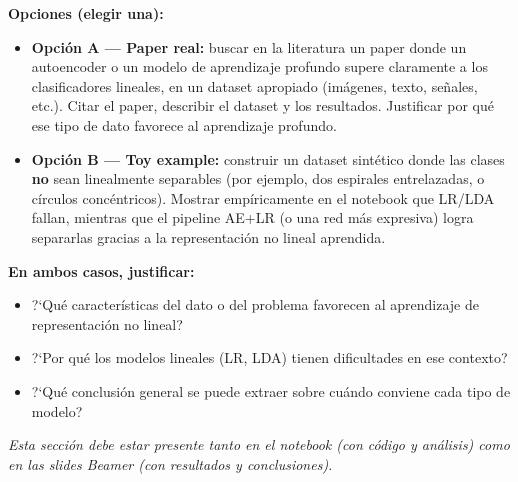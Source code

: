 \documentclass[11pt,a4paper]{article}
\begin{document}
\textbf{Opciones (elegir una):}
\begin{itemize}[leftmargin=2em,itemsep=3pt]
    \item \textbf{Opci\'on A --- Paper real:} buscar en la literatura un paper donde un autoencoder o un modelo de aprendizaje profundo supere claramente a los clasificadores lineales, en un dataset apropiado (im\'agenes, texto, se\~nales, etc.). Citar el paper, describir el dataset y los resultados. Justificar por qu\'e ese tipo de dato favorece al aprendizaje profundo.
    \item \textbf{Opci\'on B --- Toy example:} construir un dataset sint\'etico donde las clases \textbf{no} sean linealmente separables (por ejemplo, dos espirales entrelazadas, o c\'irculos conc\'entricos). Mostrar emp\'iricamente en el notebook que LR/LDA fallan, mientras que el pipeline AE+LR (o una red m\'as expresiva) logra separarlas gracias a la representaci\'on no lineal aprendida.
\end{itemize}

\textbf{En ambos casos, justificar:}
\begin{itemize}[leftmargin=2em,itemsep=2pt]
    \item ?`Qu\'e caracter\'isticas del dato o del problema favorecen al aprendizaje de representaci\'on no lineal?
    \item ?`Por qu\'e los modelos lineales (LR, LDA) tienen dificultades en ese contexto?
    \item ?`Qu\'e conclusi\'on general se puede extraer sobre cu\'ando conviene cada tipo de modelo?
\end{itemize}
\textit{Esta secci\'on debe estar presente tanto en el notebook (con c\'odigo y an\'alisis) como en las slides Beamer (con resultados y conclusiones).}
\end{document}
